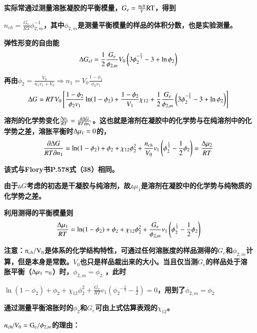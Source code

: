\documentclass{article} %
\begin{document}
{\bf  实际常通过测量溶胀凝胶的平衡模量，$G_{e} =\frac{nch}{V} {\rm RT}$，得到}

\noindent 
{\bf $n_{ch} =\frac{G_{e} }{RT} \phi _{2,m}^{-1} $，其中$\phi _{2,m} $是测量平衡模量的样品的体积分数，也是实验测量。}

\noindent 
{\bf 弹性形变的自由能
\[{\rm \Delta }G_{el} =\frac{1}{2} \frac{G_{e} }{\phi _{2,m} } V_{0} \left(3\phi _{2}^{-\frac{2}{3} } -3+\ln \phi _{2} \right)\] }

{\bf 再由$\phi _{2} =\frac{V_{0} }{n_{1} v_{1} +V_{0} } \Rightarrow n_{1} =V_{0} \frac{1-\phi _{2} }{\phi _{2} v_{1} } $
\[{\rm \Delta }G=RTV_{0} \left[\frac{1-\phi _{2} }{\phi _{2} v_{1} } \ln (1-\phi _{2} )+\frac{1-\phi _{2} }{V_{1} } \chi _{12} +\frac{1}{2} \frac{G_{e} }{\phi _{2,m} } \left(3\phi _{2}^{-\frac{2}{3} } -3+\ln \phi _{2} \right)\right]\] }


{\bf  溶剂的化学势变化$\frac{{\rm \Delta }\mu _{1} }{RT} =\frac{\partial {\rm \Delta }G}{RT\partial n_{1} } $。这也就是溶剂在凝胶中的化学势与在纯溶剂中的化学势之差，溶胀平衡时${\rm \Delta }\mu _{1} =0$的，
\[\frac{\partial {\rm \Delta }G}{RT\partial n_{1} } =\ln (1-\phi _{2} )+\phi _{2} +\chi _{12} \phi _{2}^{2} +\frac{n_{ch} }{V_{0} } v_{1} \left(\phi _{2}^{\frac{1}{3} } -\frac{1}{2} \phi _{2} \right)=\frac{{\rm \Delta }\mu _{2} }{RT} \] }

{\bf 该式与Flory书P.578式（38）相同。}

\noindent 
{\bf 由于$\vartriangle G$考虑的初态是干凝胶与纯溶剂，故$\vartriangle \mu _{1} $是溶剂在凝胶中的化学势与纯物质的化学势之差。}

\noindent 
{\bf 利用测得的平衡模量则
\[\frac{{\rm \Delta }\mu _{1} }{RT} =\ln (1-\phi _{2} )+\phi _{2} +\chi _{12} \phi _{2}^{2} +\frac{G_{e} }{\phi _{2,m} } \nu _{1} \left(\phi _{2}^{\frac{1}{3} } -\frac{1}{2} \phi _{2} \right)\] }

{\bf 注意：$n_{ch} {\rm /V}_{{\rm 0}} $是体系的化学结构特性，可通过任何溶胀度的样品测得的$G_{e} $和$\phi _{2,m} $计算，但是本身是常数。$V_{0} $也只是样品裁出来的大小。当且仅当测$G_{e} $的样品处于溶胀平衡（${\rm \Delta }\mu _{1} =_{0} $）时，$\phi _{2,m} =\phi _{2} $ ，此时}

\noindent 
{\bf $\ln (1-\phi _{2} )+\phi _{2} +\chi _{12} \phi _{2}^{2} +\frac{G_{e} }{RT} v_{1} (\phi _{2} {}^{-\frac{2}{3} } -\frac{1}{2} )=0$，用到了$\phi _{2,m} =\phi _{2} $ }

\noindent 
{\bf 通过测量平衡溶胀时的$\phi _{2} $和$G_{e} $可由上式估算表观的$\chi _{12} $。}

\noindent 
{\bf ${n_{{\rm ch}} \mathord{\left/ {\vphantom {n_{{\rm ch}}  V_{0} }} \right. \kern-\nulldelimiterspace} V_{0} } ={\rm G}_{{\rm e}} /\phi _{2,m} $的理由：}
\end{document}
